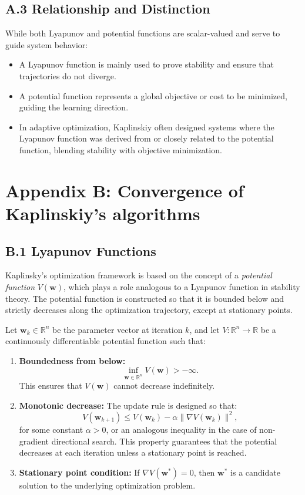 \documentclass[12pt]{article}
\begin{document}
\subsection*{A.3 Relationship and Distinction}

While both Lyapunov and potential functions are scalar-valued and serve to guide system behavior:
\begin{itemize}
  \item A Lyapunov function is mainly used to prove stability and ensure that trajectories do not diverge.
  \item A potential function represents a global objective or cost to be minimized, guiding the learning direction.
  \item In adaptive optimization, Kaplinskiy often designed systems where the Lyapunov function was derived from or closely related to the potential function, blending stability with objective minimization.
\end{itemize}

\section*{Appendix B: Convergence of Kaplinskiy's algorithms}

\subsection*{B.1 Lyapunov Functions}



Kaplinsky's optimization framework is based on the concept of a \emph{potential function} $V(\mathbf{w})$, which plays a role analogous to a Lyapunov function in stability theory. The potential function is constructed so that it is bounded below and strictly decreases along the optimization trajectory, except at stationary points.

Let $\mathbf{w}_k \in \mathbb{R}^n$ be the parameter vector at iteration $k$, and let $V: \mathbb{R}^n \to \mathbb{R}$ be a continuously differentiable potential function such that:
\begin{enumerate}
    \item \textbf{Boundedness from below:}
    \[
    \inf_{\mathbf{w} \in \mathbb{R}^n} V(\mathbf{w}) > -\infty.
    \]
    This ensures that $V(\mathbf{w})$ cannot decrease indefinitely.
    \item \textbf{Monotonic decrease:} The update rule is designed so that:
    \[
    V(\mathbf{w}_{k+1}) \le V(\mathbf{w}_k) - \alpha \|\nabla V(\mathbf{w}_k)\|^2,
    \]
    for some constant $\alpha > 0$, or an analogous inequality in the case of non-gradient directional search. This property guarantees that the potential decreases at each iteration unless a stationary point is reached.
    \item \textbf{Stationary point condition:} If $\nabla V(\mathbf{w}^*) = 0$, then $\mathbf{w}^*$ is a candidate solution to the underlying optimization problem.
\end{enumerate}
\end{document}
